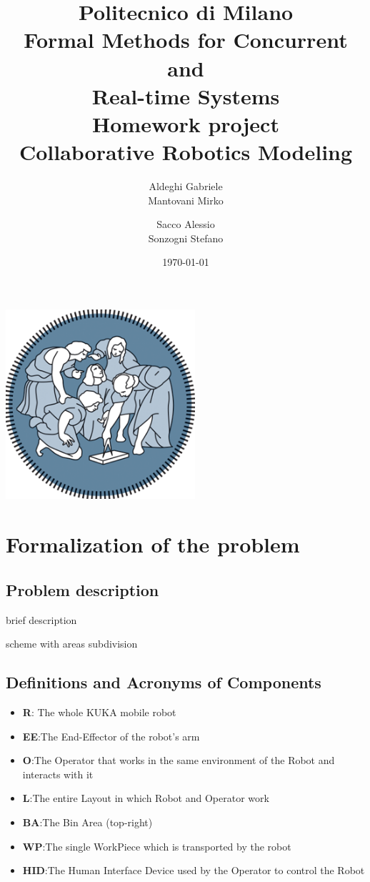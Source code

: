 \documentclass[a4paper]{article}
\title{Politecnico di Milano\\
Formal Methods for Concurrent \\
and \\
Real-time Systems\\
Homework project\\
\textbf{Collaborative Robotics Modeling }}
\author{Aldeghi Gabriele \\
  Mantovani Mirko \and
  Sacco Alessio \\
  Sonzogni Stefano}
\date{\today}
\begin{document}
\maketitle
\begin{center}
    \includegraphics[width=7cm]{images/polimi-logo}
\end{center}
\clearpage
{\hypersetup{hidelinks}\tableofcontents}
\clearpage

\section{Formalization of the problem}
\subsection{Problem description}
brief description

scheme with areas subdivision
\subsection{Definitions and Acronyms of Components}
\begin{itemize}
    \item \textbf{R}: The whole KUKA mobile robot
    \item \textbf{EE}:\@ The End-Effector of the robot's arm
    \item \textbf{O}:\@ The Operator that works in the same environment of the Robot and interacts with it
    \item \textbf{L}:\@ The entire Layout in which Robot and Operator work
    \item \textbf{BA}:\@ The Bin Area (top-right)
    \item \textbf{WP}:\@ The single WorkPiece which is transported by the robot
    \item \textbf{HID}:\@ The Human Interface Device used by the Operator to control the Robot
\end{itemize}
\end{document}

